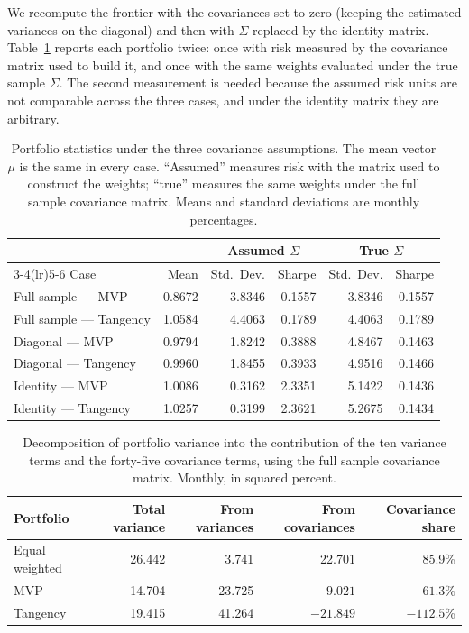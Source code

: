 \documentclass[11pt]{article}
\begin{document}
We recompute the frontier with the covariances set to zero (keeping the
estimated variances on the diagonal) and then with $\Sigma$ replaced by the
identity matrix. Table~\ref{tab:q1c} reports each portfolio twice: once with
risk measured by the covariance matrix used to build it, and once with the
same weights evaluated under the true sample $\Sigma$. The second measurement
is needed because the assumed risk units are not comparable across the three
cases, and under the identity matrix they are arbitrary.

\begin{table}[H]
\centering
\caption{Portfolio statistics under the three covariance assumptions. The mean
vector $\mu$ is the same in every case. ``Assumed'' measures risk with the
matrix used to construct the weights; ``true'' measures the same weights under
the full sample covariance matrix. Means and standard deviations are monthly
percentages.}
\begin{tabular}{lrrrrr}
\toprule
 & & \multicolumn{2}{c}{Assumed $\Sigma$} & \multicolumn{2}{c}{True $\Sigma$} \\
\cmidrule(lr){3-4}\cmidrule(lr){5-6}
Case & Mean & Std.\ Dev. & Sharpe & Std.\ Dev. & Sharpe \\
\midrule
Full sample --- MVP & 0.8672 & 3.8346 & 0.1557 & 3.8346 & 0.1557 \\
Full sample --- Tangency & 1.0584 & 4.4063 & 0.1789 & 4.4063 & 0.1789 \\
Diagonal --- MVP & 0.9794 & 1.8242 & 0.3888 & 4.8467 & 0.1463 \\
Diagonal --- Tangency & 0.9960 & 1.8455 & 0.3933 & 4.9516 & 0.1466 \\
Identity --- MVP & 1.0086 & 0.3162 & 2.3351 & 5.1422 & 0.1436 \\
Identity --- Tangency & 1.0257 & 0.3199 & 2.3621 & 5.2675 & 0.1434 \\
\bottomrule
\end{tabular}
\label{tab:q1c}
\end{table}

\begin{table}[H]
\centering
\caption{Decomposition of portfolio variance into the contribution of the ten
variance terms and the forty-five covariance terms, using the full sample
covariance matrix. Monthly, in squared percent.}
\begin{tabular}{lrrrr}
\toprule
Portfolio & Total variance & From variances & From covariances & Covariance share \\
\midrule
Equal weighted & 26.442 & 3.741 & 22.701 & 85.9\% \\
MVP & 14.704 & 23.725 & $-9.021$ & $-61.3$\% \\
Tangency & 19.415 & 41.264 & $-21.849$ & $-112.5$\% \\
\bottomrule
\end{tabular}
\label{tab:q1c_decomp}
\end{table}
\end{document}
